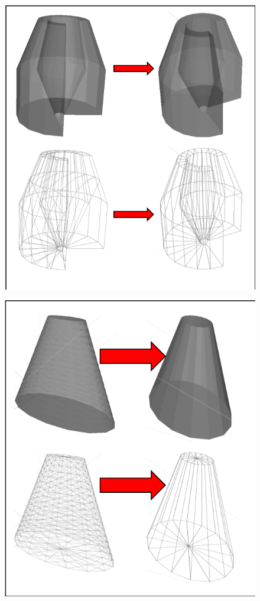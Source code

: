 \documentclass[12pt,a4paper]{article}
\begin{document}
\begin{figure}[h!]
\centering
\begin{minipage}{.4\textwidth}
  \centering
  \includegraphics[height=1\linewidth]{Images//Meshes//polycone.png}
  \label{polypic1}
\end{minipage}%
\begin{minipage}{.4\textwidth}
  \centering
  \includegraphics[height=1\linewidth]{Images//Meshes//ellipticalcone.png}
  \label{elco1}
\end{minipage}%
\end{figure}
\end{document}
